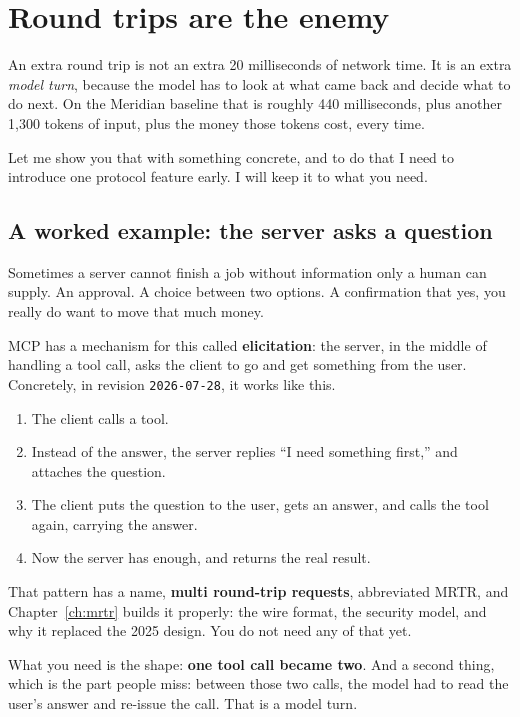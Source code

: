 \section{Round trips are the enemy}
\label{sec:round-trips}

An extra round trip is not an extra 20 milliseconds of network time. It is an
extra \emph{model turn}, because the model has to look at what came back and
decide what to do next. On the Meridian baseline that is roughly 440
milliseconds, plus another 1,300 tokens of input, plus the money those tokens
cost, every time.

Let me show you that with something concrete, and to do that I need to introduce
one protocol feature early. I will keep it to what you need.

\subsection{A worked example: the server asks a question}

Sometimes a server cannot finish a job without information only a human can
supply. An approval. A choice between two options. A confirmation that yes, you
really do want to move that much money.

MCP has a mechanism for this called \textbf{elicitation}: the server, in the
middle of handling a tool call, asks the client to go and get something from the
user. Concretely, in revision \texttt{2026-07-28}, it works like this.

\begin{enumerate}[leftmargin=1.6em, itemsep=3pt]
\item The client calls a tool.
\item Instead of the answer, the server replies ``I need something first,'' and
      attaches the question.
\item The client puts the question to the user, gets an answer, and calls the
      tool again, carrying the answer.
\item Now the server has enough, and returns the real result.
\end{enumerate}

That pattern has a name, \textbf{multi round-trip requests}, abbreviated MRTR,
and Chapter~\ref{ch:mrtr} builds it properly: the wire format, the security
model, and why it replaced the 2025 design. You do not need any of that yet.

What you need is the shape: \textbf{one tool call became two}. And a second
thing, which is the part people miss: between those two calls, the model had to
read the user's answer and re-issue the call. That is a model turn.

